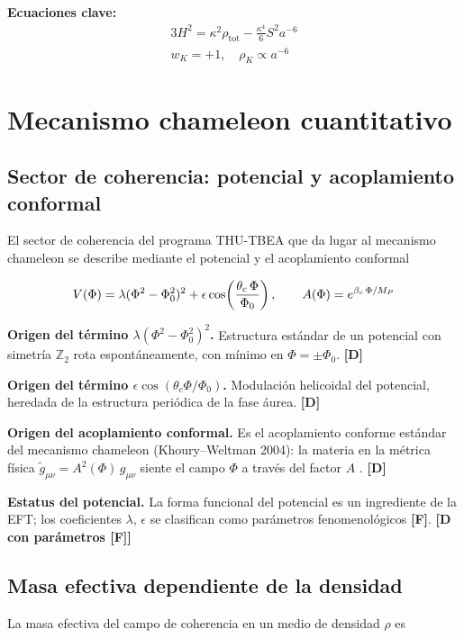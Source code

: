 ﻿\documentclass[11pt,letterpaper]{article}
\begin{document}
\textbf{Ecuaciones clave:}
\begin{align*}
    3H^2 = \kappa^2\rho_{\mathrm{tot}} - \frac{\kappa^4}{6}S^2 a^{-6} \\
    w_K = +1, \quad \rho_K \propto a^{-6}
\end{align*}
\section{Mecanismo chameleon cuantitativo}
\subsection{Sector de coherencia: potencial y acoplamiento conformal}
El sector de coherencia del programa THU-TBEA que da lugar al mecanismo chameleon se describe mediante el potencial y el acoplamiento conformal

\begin{equation*}
  \resizebox{\ifdim\width>\linewidth \linewidth\else\width\fi}{!}{$\displaystyle V(\Phi) = \lambda(\Phi^2 - \Phi_0^2)^2 + \epsilon\cos\!\left(\frac{\theta_c\,\Phi}{\Phi_0}\right), \qquad A(\Phi) = e^{\beta_c\,\Phi/M_P}$}
\end{equation*}

\textbf{Origen del término $\lambda(\Phi^2 - \Phi_0^2)^2$.} Estructura estándar de un potencial con simetría $\mathbb{Z}_2$ rota espontáneamente, con mínimo en $\Phi = \pm\Phi_0$. \textbf{[D]}

\textbf{Origen del término $\epsilon\cos(\theta_c\Phi/\Phi_0)$.} Modulación helicoidal del potencial, heredada de la estructura periódica de la fase áurea. \textbf{[D]}

\textbf{Origen del acoplamiento conformal.} Es el acoplamiento conforme estándar del mecanismo chameleon (Khoury--Weltman 2004): la materia en la métrica física $\tilde g_{\mu\nu} = A^2(\Phi)\,g_{\mu\nu}$ siente el campo $\Phi$ a través del factor $A$ \cite{KhouryWeltman2004a}. \textbf{[D]}

\textbf{Estatus del potencial.} La forma funcional del potencial es un ingrediente de la EFT; los coeficientes $\lambda$, $\epsilon$ se clasifican como parámetros fenomenológicos \textbf{[F]}. \textbf{[D con parámetros [F]]}
\subsection{Masa efectiva dependiente de la densidad}
La masa efectiva del campo de coherencia en un medio de densidad $\rho$ es
\end{document}
